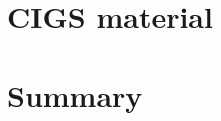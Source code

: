 \documentclass[a4paper]{report}
\begin{document}

\chapter{CIGS material}


\chapter{Summary}
\end{document}
